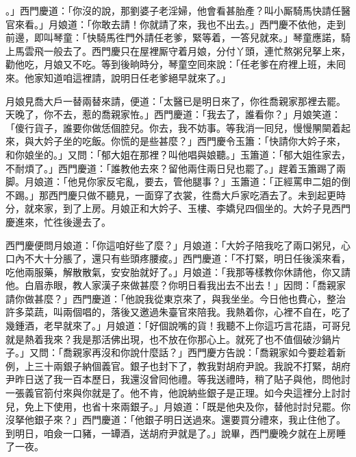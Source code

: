 。」西門慶道：「你沒的說，那劉婆子老淫婦，他會看甚胎產？叫小厮騎馬快請任醫官來看。」月娘道：「你敢去請！你就請了來，我也不出去。」西門慶不依他，走到前邊，即叫琴童：「快騎馬徃門外請任老爹，緊等着，一答兒就來。」琴童應諾，騎上馬雲飛一般去了。西門慶只在屋裡厮守着月娘，分付丫頭，連忙熬粥兒拏上來，勸他吃，月娘又不吃。等到後晌時分，琴童空囘來說：「任老爹在府裡上班，未囘來。他家知道咱這裡請，說明日任老爹絕早就來了。」

月娘見喬大戶一替兩替來請，便道：「太醫已是明日來了，你徃喬親家那裡去罷。天晚了，你不去，惹的喬親家恠。」西門慶道：「我去了，誰看你？」月娘笑道：「傻行貨子，誰要你做恁個腔兒。你去，我不妨事。等我消一囘兒，慢慢䦛䦟着起來，與大妗子坐的吃飯。你慌的是些甚麼？」西門慶令玉簫：「快請你大妗子來，和你娘坐的。」又問：「郁大姐在那裡？叫他唱與娘聽。」玉簫道：「郁大姐徃家去，不耐煩了。」西門慶道：「誰教他去來？留他兩住兩日兒也罷了。」趕着玉簫踢了兩脚。月娘道：「他見你家反宅亂，要去，管他腿事？」玉簫道：「正經罵申二姐的倒不踢。」{}那西門慶只做不聽見，一面穿了衣裳，徃喬大戶家吃酒去了。未到起更時分，就來家，到了上房。月娘正和大妗子、玉樓、李嬌兒四個坐的。大妗子見西門慶進來，忙徃後邊去了。

西門慶便問月娘道：「你這咱好些了麼？」月娘道：「大妗子陪我吃了兩口粥兒，心口內不大十分脹了，還只有些頭疼腰痠。」西門慶道：「不打緊，明日任後溪來看，吃他兩服藥，解散散氣，安安胎就好了。」月娘道：「我那等樣教你休請他，你又請他。白眉赤眼，教人家漢子來做甚麼？你明日看我出去不出去！」因問：「喬親家請你做甚麼？」西門慶道：「他說我從東京來了，與我坐坐。今日他也費心，整治許多菜蔬，叫兩個唱的，落後又邀過朱臺官來陪我。我熱着你，心裡不自在，吃了幾鍾酒，老早就來了。」月娘道：「好個說嘴的貨！我聽不上你這巧言花語，可哥兒就是熱着我來？我是那活佛出現，也不放在你那心上。就死了也不值個破沙鍋片子。」又問：「喬親家再沒和你說什麼話？」西門慶方告說：「喬親家如今要趁着新例，上三十兩銀子納個義官。銀子也封下了，教我對胡府尹說。我說不打緊，胡府尹昨日送了我一百本歷日，我還沒曾囘他禮。等我送禮時，稍了貼子與他，問他討一張義官箚付來與你就是了。他不肯，他說納些銀子是正理。如今央這裡分上討討兒，免上下使用，也省十來兩銀子。」月娘道：「既是他央及你，替他討討兒罷。你沒拏他銀子來？」西門慶道：「他銀子明日送過來。還要買分禮來，我止住他了。到明日，咱僉一口豬，一罈酒，送胡府尹就是了。」說畢，西門慶晚夕就在上房睡了一夜。

